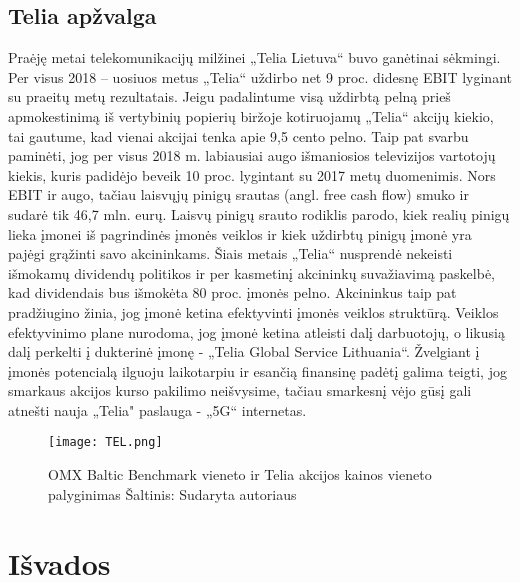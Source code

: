\documentclass[titlepage, 11pt]{article}
\begin{document}
\subsection{Telia apžvalga}
Praėję metai telekomunikacijų milžinei „Telia Lietuva“ buvo ganėtinai sėkmingi. Per visus 2018 – uosiuos metus „Telia“ uždirbo net 9 proc. didesnę EBIT lyginant su praeitų metų rezultatais.  Jeigu padalintume visą uždirbtą pelną prieš apmokestinimą iš vertybinių popierių biržoje kotiruojamų „Telia“ akcijų kiekio, tai gautume, kad vienai akcijai tenka apie 9,5 cento pelno. Taip pat svarbu paminėti, jog per visus 2018 m. labiausiai augo išmaniosios televizijos vartotojų kiekis, kuris padidėjo beveik 10 proc. lygintant su 2017 metų duomenimis. Nors EBIT ir augo, tačiau laisvųjų pinigų srautas (angl. free cash flow) smuko ir sudarė tik 46,7 mln. eurų. Laisvų pinigų srauto rodiklis parodo, kiek realių pinigų lieka įmonei iš pagrindinės įmonės veiklos ir kiek uždirbtų pinigų įmonė yra pajėgi grąžinti savo akcininkams. Šiais metais „Telia“ nusprendė nekeisti išmokamų dividendų politikos ir per kasmetinį akcininkų suvažiavimą paskelbė, kad dividendais bus išmokėta 80 proc. įmonės pelno. Akcininkus taip pat pradžiugino žinia, jog įmonė ketina efektyvinti įmonės veiklos struktūrą. Veiklos efektyvinimo plane nurodoma, jog įmonė ketina atleisti dalį darbuotojų, o likusią dalį perkelti į dukterinė įmonę - „Telia Global Service Lithuania“. Žvelgiant į įmonės potencialą ilguoju laikotarpiu ir esančią finansinę padėtį galima teigti, jog smarkaus akcijos kurso pakilimo neišvysime, tačiau smarkesnį vėjo gūsį gali atnešti nauja „Telia" paslauga - „5G“ internetas.
\begin{figure}[H]
\captionsetup{justification=centering}
\center
\texttt{[image: TEL.png]}
\caption{OMX Baltic Benchmark vieneto ir Telia akcijos kainos vieneto palyginimas \newline
Šaltinis: Sudaryta autoriaus}
\end{figure}

\section{Išvados}
\end{document}
